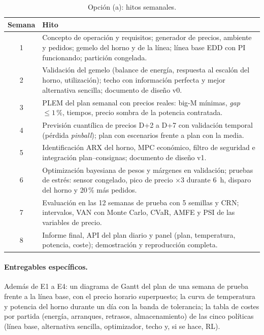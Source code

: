 \begin{table}[H]
\centering\small
\caption{Opción (a): hitos semanales.}\label{tab:hitos-a}
\begin{tabularx}{\textwidth}{@{}c>{\raggedright\arraybackslash}X@{}}
\toprule
Semana & Hito \\
\midrule
1 & Concepto de operación y requisitos; generador de precios, ambiente y pedidos; gemelo del horno y de la línea; línea base EDD con PI funcionando; partición congelada. \\
2 & Validación del gemelo (balance de energía, respuesta al escalón del horno, utilización); techo con información perfecta y mejor alternativa sencilla; documento de diseño v0. \\
3 & PLEM del plan semanal con precios reales: big-M mínimas, \emph{gap} $\le 1\,\%$, tiempos, precio sombra de la potencia contratada. \\
4 & Previsión cuantílica de precios D+2 a D+7 con validación temporal (pérdida \emph{pinball}); plan con escenarios frente a plan con la media. \\
5 & Identificación ARX del horno, MPC económico, filtro de seguridad e integración plan--consignas; documento de diseño v1. \\
6 & Optimización bayesiana de pesos y márgenes en validación; pruebas de estrés: sensor congelado, pico de precio $\times 3$ durante 6~h, disparo del horno y 20\,\% más pedidos. \\
7 & Evaluación en las 12 semanas de prueba con 5 semillas y CRN; intervalos, VAN con Monte Carlo, CVaR, AMFE y PSI de las variables de precio. \\
8 & Informe final, API del plan diario y panel (plan, temperatura, potencia, coste); demostración y reproducción completa. \\
\bottomrule
\end{tabularx}
\end{table}

\paragraph{Entregables específicos.} Además de E1 a E4: un diagrama de Gantt del plan de una semana de prueba frente a la línea base, con el precio horario superpuesto; la curva de temperatura y potencia del horno durante un día con la banda de tolerancia; la tabla de costes por partida (energía, arranques, retrasos, almacenamiento) de las cinco políticas (línea base, alternativa sencilla, optimizador, techo y, si se hace, RL).

